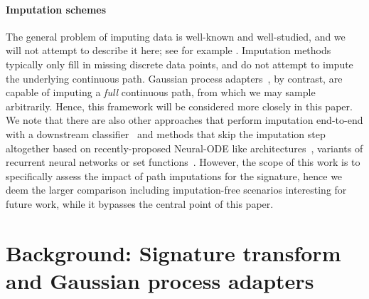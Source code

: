 \documentclass{article}
\begin{document}
\paragraph{Imputation schemes} The general problem of imputing data is well-known and well-studied, and
we will not attempt to describe it here; see for example \citet[Chapter 25]{gelman2007dataanalysis}.
Imputation methods typically only fill in missing discrete data
points, and do not attempt to impute the underlying continuous path.
Gaussian process adapters~\citep{li2016scalable}, by contrast, are
capable of imputing a \emph{full} continuous path, from which we
may sample arbitrarily. Hence, this framework will be
considered more closely in this paper.
We note that there are also other approaches that
perform imputation end-to-end with a downstream classifier~\citep{shukla2018interpolationprediction}
and methods that skip the imputation step altogether based on recently-proposed Neural-ODE like architectures~\citep{rubanova2019latent, kidger2020neuralcde}, variants of recurrent neural networks \cite{che2018recurrent} or set functions~\cite{horn2019set}.
However, the scope of this work is to specifically assess the impact of path imputations for the signature, hence we deem the larger comparison including imputation-free scenarios interesting for future work, while it bypasses the central point of this paper.

\section{Background: Signature transform and Gaussian process adapters} %
\end{document}

